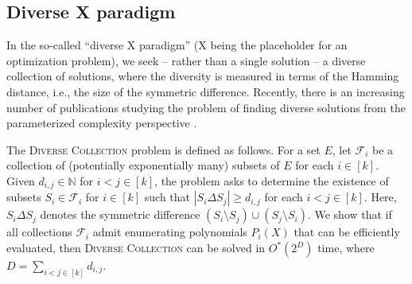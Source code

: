\documentclass{theoretics}
\newcommand{\N}{\ensuremath{\mathbb N}\xspace}
\newcommand{\cF}{\ensuremath{\mathcal F}\xspace}
\begin{document}
\subsection{Diverse X paradigm} \label{sec:diverse}


In the so-called ``diverse X paradigm'' (X being the placeholder for an optimization problem), we seek -- rather than a single solution -- a diverse collection of solutions, where the diversity is measured in terms of the Hamming distance, i.e., the size of the symmetric difference.
Recently, there is an increasing number of publications studying the problem of finding diverse solutions from the parameterized complexity perspective \cite{BasteFJMOPR22,BasteJMPR19,FominGJPS24,FominGPPS24,HanakaKKO21}.

The \textsc{Diverse Collection} problem is defined as follows.
For a set $E$, let $\cF_i$ be a collection of (potentially exponentially many) subsets of $E$ for each $i \in [k]$.
Given $d_{i,j} \in \N$ for $i < j \in [k]$, the problem asks to determine the existence of subsets $S_i \in \cF_i$ for $i \in [k]$ such that $|S_i \Delta S_j| \ge d_{i,j}$ for each $i < j \in [k]$.
Here, $S_i \Delta S_j$ denotes the symmetric difference $(S_i \setminus S_j) \cup (S_j \setminus S_i)$.
We show that if all collections $\cF_i$ admit enumerating polynomials $P_i(X)$ that can be efficiently evaluated, then \textsc{Diverse Collection} can be solved in $O^*(2^D)$ time, where $D = \sum_{i < j \in [k]} d_{i,j}$.
\end{document}
